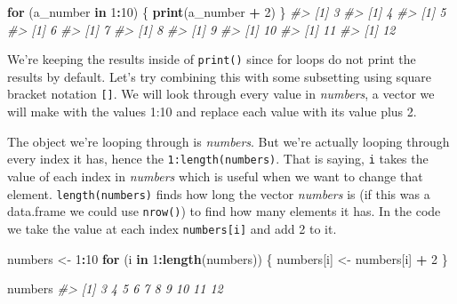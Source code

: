 \documentclass[
  12pt,
]{book}
\newenvironment{Shaded}{\begin{snugshade}}{\end{snugshade}}
\newcommand{\CommentTok}[1]{\textcolor[rgb]{0.37,0.37,0.37}{\textit{#1}}}
\newcommand{\ControlFlowTok}[1]{\textcolor[rgb]{0.27,0.27,0.27}{\textbf{#1}}}
\newcommand{\DecValTok}[1]{\textcolor[rgb]{0.06,0.06,0.06}{#1}}
\newcommand{\KeywordTok}[1]{\textcolor[rgb]{0.27,0.27,0.27}{\textbf{#1}}}
\newcommand{\NormalTok}[1]{#1}
\newcommand{\OperatorTok}[1]{\textcolor[rgb]{0.43,0.43,0.43}{\textbf{#1}}}
\newcommand{\StringTok}[1]{\textcolor[rgb]{0.5,0.5,0.5}{#1}}
\begin{document}
\begin{Shaded}
\begin{Highlighting}[]
\ControlFlowTok{for}\NormalTok{ (a\_number }\ControlFlowTok{in} \DecValTok{1}\OperatorTok{:}\DecValTok{10}\NormalTok{) \{}
   \KeywordTok{print}\NormalTok{(a\_number }\OperatorTok{+}\StringTok{ }\DecValTok{2}\NormalTok{)}
\NormalTok{\}}
\CommentTok{\#\textgreater{} [1] 3}
\CommentTok{\#\textgreater{} [1] 4}
\CommentTok{\#\textgreater{} [1] 5}
\CommentTok{\#\textgreater{} [1] 6}
\CommentTok{\#\textgreater{} [1] 7}
\CommentTok{\#\textgreater{} [1] 8}
\CommentTok{\#\textgreater{} [1] 9}
\CommentTok{\#\textgreater{} [1] 10}
\CommentTok{\#\textgreater{} [1] 11}
\CommentTok{\#\textgreater{} [1] 12}
\end{Highlighting}
\end{Shaded}

We're keeping the results inside of \texttt{print()} since for loops do not print the results by default. Let's try combining this with some subsetting using square bracket notation \texttt{{[}{]}}. We will look through every value in \emph{numbers}, a vector we will make with the values 1:10 and replace each value with its value plus 2.

The object we're looping through is \emph{numbers}. But we're actually looping through every index it has, hence the \texttt{1:length(numbers)}. That is saying, \texttt{i} takes the value of each index in \emph{numbers} which is useful when we want to change that element. \texttt{length(numbers)} finds how long the vector \emph{numbers} is (if this was a data.frame we could use \texttt{nrow()}) to find how many elements it has. In the code we take the value at each index \texttt{numbers{[}i{]}} and add 2 to it.

\begin{Shaded}
\begin{Highlighting}[]
\NormalTok{numbers \textless{}{-}}\StringTok{ }\DecValTok{1}\OperatorTok{:}\DecValTok{10}
\ControlFlowTok{for}\NormalTok{ (i }\ControlFlowTok{in} \DecValTok{1}\OperatorTok{:}\KeywordTok{length}\NormalTok{(numbers)) \{}
\NormalTok{  numbers[i] \textless{}{-}}\StringTok{ }\NormalTok{numbers[i] }\OperatorTok{+}\StringTok{ }\DecValTok{2}
\NormalTok{\}}
\end{Highlighting}
\end{Shaded}

\begin{Shaded}
\begin{Highlighting}[]
\NormalTok{numbers}
\CommentTok{\#\textgreater{}  [1]  3  4  5  6  7  8  9 10 11 12}
\end{Highlighting}
\end{Shaded}
\end{document}
